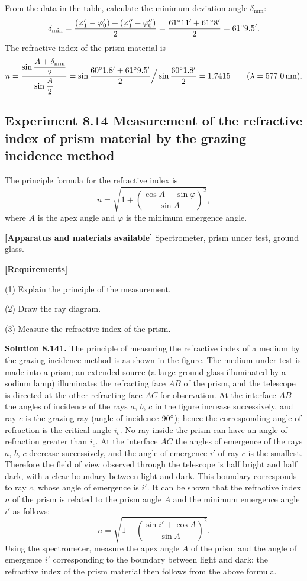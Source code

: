 From the data in the table, calculate the minimum deviation angle $\delta_{\min}$:
\[
\delta_{\min}=\frac{(\varphi_1'-\varphi_0')+(\varphi_1''-\varphi_0'')}{2}
=\frac{61^{\circ}11'+61^{\circ}8'}{2}=61^{\circ}9.5'.
\]
The refractive index of the prism material is
\[
n=\frac{\sin\dfrac{A+\delta_{\min}}{2}}{\sin\dfrac{A}{2}}
=\sin\frac{60^{\circ}1.8'+61^{\circ}9.5'}{2}\Big/\sin\frac{60^{\circ}1.8'}{2}
=1.7415\qquad(\lambda=577.0\,\mathrm{nm}).
\]

\subsection*{Experiment 8.14 \quad Measurement of the refractive index of prism material by the grazing incidence method}

The principle formula for the refractive index is
\[
n=\sqrt{1+\left(\frac{\cos A+\sin\varphi}{\sin A}\right)^2},
\]
where $A$ is the apex angle and $\varphi$ is the minimum emergence angle.

\textbf{[Apparatus and materials available]} Spectrometer, prism under test, ground glass.

\textbf{[Requirements]}

(1) Explain the principle of the measurement.

(2) Draw the ray diagram.

(3) Measure the refractive index of the prism.

\textbf{Solution 8.14}\quad \textbf{1.} The principle of measuring the refractive index of a medium by the grazing incidence method is as shown in the figure. The medium under test is made into a prism; an extended source (a large ground glass illuminated by a sodium lamp) illuminates the refracting face $AB$ of the prism, and the telescope is directed at the other refracting face $AC$ for observation. At the interface $AB$ the angles of incidence of the rays $a$, $b$, $c$ in the figure increase successively, and ray $c$ is the grazing ray (angle of incidence $90^{\circ}$); hence the corresponding angle of refraction is the critical angle $i_c$. No ray inside the prism can have an angle of refraction greater than $i_c$. At the interface $AC$ the angles of emergence of the rays $a$, $b$, $c$ decrease successively, and the angle of emergence $i'$ of ray $c$ is the smallest. Therefore the field of view observed through the telescope is half bright and half dark, with a clear boundary between light and dark. This boundary corresponds to ray $c$, whose angle of emergence is $i'$. It can be shown that the refractive index $n$ of the prism is related to the prism angle $A$ and the minimum emergence angle $i'$ as follows:
\[
n=\sqrt{1+\left(\frac{\sin i'+\cos A}{\sin A}\right)^2}.
\]
Using the spectrometer, measure the apex angle $A$ of the prism and the angle of emergence $i'$ corresponding to the boundary between light and dark; the refractive index of the prism material then follows from the above formula.

